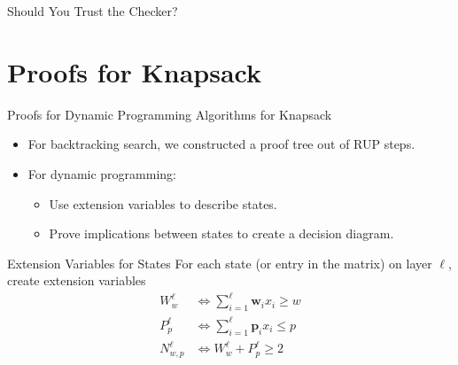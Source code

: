 \documentclass[aspectratio=169,compress,10pt]{beamer}
\begin{document}
\begin{frame}{Should You Trust the Checker?}
\begin{center}
      \end{center}
\end{frame}

\section{Proofs for Knapsack}

\begin{frame}{Proofs for Dynamic Programming Algorithms for Knapsack}
    \begin{itemize}
        \item For backtracking search, we constructed a proof tree out of RUP steps.
        \item For dynamic programming:
            \begin{itemize}
                \item Use extension variables to describe states.
                \item Prove implications between states to create a decision diagram.
            \end{itemize}
    \end{itemize}
\end{frame}

\begin{frame}{Extension Variables for States}
    For each state (or entry in the matrix) on layer $\ell$, create extension variables
    \begin{align*}
        W^{\ell}_{w} &\Leftrightarrow \sum_{i=1}^{\ell} \boldsymbol{w}_i x_i \ge w \\
        P^{\ell}_{p} &\Leftrightarrow \sum_{i=1}^{\ell} \boldsymbol{p}_i x_i \le p \\
        N^{\ell}_{w,p} & \Leftrightarrow W^{\ell}_{w} + P^{\ell}_{p} \ge 2
    \end{align*}
\end{frame}
\end{document}
